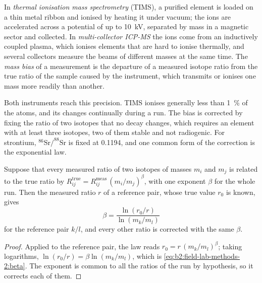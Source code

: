 \begin{definition}\label{def:b2:field-lab-methods-2:tims}
In \emph{thermal ionisation mass spectrometry} (TIMS), a
purified element is loaded on a thin metal ribbon and ionised by heating it under vacuum; the ions
are accelerated across a potential of up to \qty{10}{kV}, separated by mass in a magnetic sector
and collected. In \emph{multi-collector ICP-MS} the ions come from an
inductively coupled plasma, which ionises elements that are hard to ionise thermally, and several
collectors measure the beams of different masses at the same time. The \emph{mass
bias} of a measurement is the departure of a measured isotope ratio from the true
ratio of the sample caused by the instrument, which transmits or ionises one mass more readily than
another.
\end{definition}

Both instruments reach this precision. TIMS ionises generally less than
\qty{1}{\percent} of the atoms, and its  changes continually during a run. The bias is corrected by fixing the ratio of two isotopes that no
decay changes, which requires an element with at least three isotopes, two of them stable and not
radiogenic. For strontium, $^{86}\mathrm{Sr}/^{88}\mathrm{Sr}$ is fixed at 0.1194, and one common
form of the correction is the exponential law.

\begin{proposition}\label{prop:b2:field-lab-methods-2:bias}
Suppose that every measured ratio of two isotopes of masses $m_i$ and $m_j$ is related to the true
ratio by $R_{ij}^{\mathrm{true}} = R_{ij}^{\mathrm{meas}}\,(m_i/m_j)^{\beta}$, with one exponent
$\beta$ for the whole run. Then the measured ratio $r$ of a reference pair, whose true value
$r_0$ is known, gives
\begin{equation}
\beta = \frac{\ln(r_0/r)}{\ln(m_k/m_l)}
\label{eq:b2:field-lab-methods-2:beta}
\end{equation}
for the reference pair $k/l$, and every other ratio is corrected with the same $\beta$.
\end{proposition}

\begin{proof}
Applied to the reference pair, the law reads $r_0 = r\,(m_k/m_l)^\beta$; taking logarithms,
$\ln(r_0/r) = \beta\ln(m_k/m_l)$, which is \eqref{eq:b2:field-lab-methods-2:beta}. The exponent is
common to all the ratios of the run by hypothesis, so it corrects each of them.
\end{proof}

